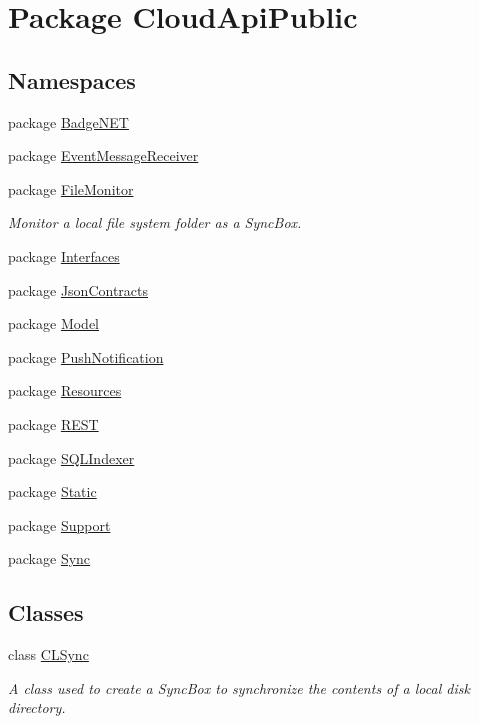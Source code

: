 \hypertarget{namespace_cloud_api_public}{\section{Package Cloud\-Api\-Public}
\label{namespace_cloud_api_public}
}
\subsection*{Namespaces}
\begin{DoxyCompactItemize}
\item 
package \hyperlink{namespace_cloud_api_public_1_1_badge_n_e_t}{Badge\-N\-E\-T}
\item 
package \hyperlink{namespace_cloud_api_public_1_1_event_message_receiver}{Event\-Message\-Receiver}
\item 
package \hyperlink{namespace_cloud_api_public_1_1_file_monitor}{File\-Monitor}
\begin{DoxyCompactList}\small\item\em Monitor a local file system folder as a Sync\-Box. \end{DoxyCompactList}\item 
package \hyperlink{namespace_cloud_api_public_1_1_interfaces}{Interfaces}
\item 
package \hyperlink{namespace_cloud_api_public_1_1_json_contracts}{Json\-Contracts}
\item 
package \hyperlink{namespace_cloud_api_public_1_1_model}{Model}
\item 
package \hyperlink{namespace_cloud_api_public_1_1_push_notification}{Push\-Notification}
\item 
package \hyperlink{namespace_cloud_api_public_1_1_resources}{Resources}
\item 
package \hyperlink{namespace_cloud_api_public_1_1_r_e_s_t}{R\-E\-S\-T}
\item 
package \hyperlink{namespace_cloud_api_public_1_1_s_q_l_indexer}{S\-Q\-L\-Indexer}
\item 
package \hyperlink{namespace_cloud_api_public_1_1_static}{Static}
\item 
package \hyperlink{namespace_cloud_api_public_1_1_support}{Support}
\item 
package \hyperlink{namespace_cloud_api_public_1_1_sync}{Sync}
\end{DoxyCompactItemize}
\subsection*{Classes}
\begin{DoxyCompactItemize}
\item 
class \hyperlink{class_cloud_api_public_1_1_c_l_sync}{C\-L\-Sync}
\begin{DoxyCompactList}\small\item\em A class used to create a Sync\-Box to synchronize the contents of a local disk directory. \end{DoxyCompactList}\end{DoxyCompactItemize}

